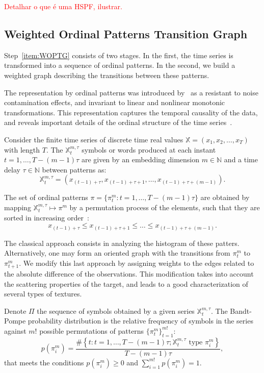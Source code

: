 \documentclass{isprs}
\begin{document}
\textcolor{red}{Detalhar o que é uma HSPF, ilustrar.}

\subsection{Weighted Ordinal Patterns Transition Graph}

Step~\ref{item:WOPTG} consists of two stages.
In the first, the time series is transformed into a sequence of ordinal patterns.
In the second, we build a weighted graph describing the transitions between these patterns.

The representation by ordinal patterns was introduced by~\cite{Bandt2002Permutation} as a resistant to noise contamination effects, and invariant to linear and nonlinear monotonic transformations.
This representation captures the temporal causality of the data, and reveals important details of the ordinal structure of the time series~\citep{Larrondo2006Random}.

Consider the finite time series of discrete time real values $\mathbb{X} = (x_1, x_2, \dots, x_T)$ with length $T$.
The $\mathbb{X}_t^{m, \tau} $ symbols or words produced at each instant $t = 1, \dots, T- (m-1) \tau$ are given by an embedding dimension $m \in \mathbb{N}$ and a time delay $\tau \in \mathbb{N}$ between patterns as:
\begin{equation}
\mathbb{X}_t^{m,\tau} = (x_{(t-1)+\tau}, x_{(t-1)+\tau+1},\ldots, x_{(t-1)+\tau+(m-1)}).
\end{equation}

The set of ordinal patterns $\pi = \{\pi_t^m: t = 1, \dots, T- (m-1) \tau \}$ are obtained by mapping $\mathbb{X}^{m, \tau}_t \mapsto \pi^m$ by a permutation process of the elements, such that they are sorted in increasing order~\citep{Ravetti2014noise}:
$$
x_{(t-1) + \tau} \leq x_{(t-1) + \tau + 1} \leq \dots \leq x_{(t-1) + \tau + (m-1)}.
$$

The classical approach consists in analyzing the histogram of these patters.
Alternatively, one may form an oriented graph with the transitions from $\pi_t^m$ to $\pi_{t+1}^m$.
We modify this last approach by assigning weights to the edges related to the absolute difference of the observations.
This modification takes into account the scattering properties of the target, and leads to a good characterization of several types of textures.

Denote $\Pi$ the sequence of symbols obtained by a given series $\mathbb{X}_t^{m,\tau}$.
The Bandt-Pompe probability distribution is the relative frequency of symbols in the series against $m!$ possible permutations of patterns $\{\pi_t^m \}_{t = 1}^{m!}$:
\begin{equation}
p(\pi_i^m) = \frac{\#\left \{t : t = 1, \dots, T-(m-1)\tau; \mathbb{X}_t^{m,\tau} \text{ type } \pi_i^m\right \}}{T- (m-1)\tau},  
\end{equation}
that meets the conditions $p(\pi_i^m) \ge 0$ and  $\sum_{i=1}^{m!} p(\pi_i^m) = 1$.
\end{document}
